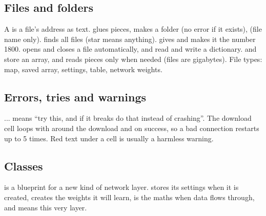\subsection{Files and folders}\label{py:files}
A  is a file's address as text.  glues pieces,  makes a folder (no error if it exists),  (file name only). finds all  files (star means anything).  gives  and  makes it the number 1800.  opens and closes a file automatically,  and  read and write a dictionary.  and  store an array, and  reads pieces only when needed (files are gigabytes). File types:  map,  saved array,  settings,  table,  network weights.

\subsection{Errors, tries and warnings}\label{py:errors}
 ...  means ``try this, and if it breaks do that instead of crashing''. The download cell loops  with  around the download and  on success, so a bad connection restarts up to 5 times. Red text under a cell is usually a harmless warning.

\subsection{Classes}\label{py:classes}
 is a blueprint for a new kind of network layer.  stores its settings when it is created,  creates the weights it will learn,  is the maths when data flows through, and  means this very layer.

